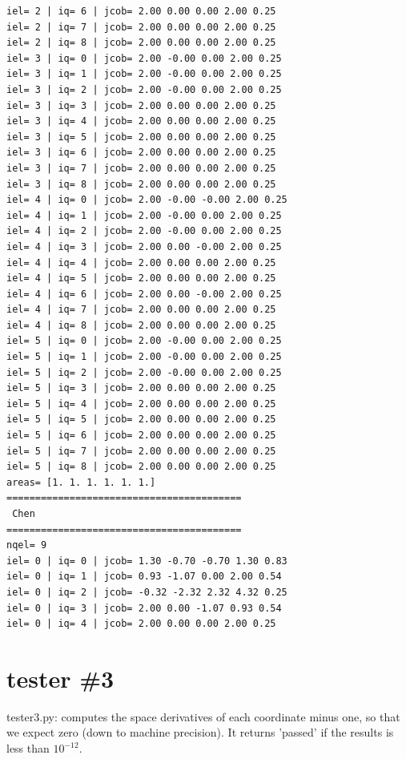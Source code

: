 \begin{tiny}
\begin{verbatim}
iel= 2 | iq= 6 | jcob= 2.00 0.00 0.00 2.00 0.25
iel= 2 | iq= 7 | jcob= 2.00 0.00 0.00 2.00 0.25
iel= 2 | iq= 8 | jcob= 2.00 0.00 0.00 2.00 0.25
iel= 3 | iq= 0 | jcob= 2.00 -0.00 0.00 2.00 0.25
iel= 3 | iq= 1 | jcob= 2.00 -0.00 0.00 2.00 0.25
iel= 3 | iq= 2 | jcob= 2.00 -0.00 0.00 2.00 0.25
iel= 3 | iq= 3 | jcob= 2.00 0.00 0.00 2.00 0.25
iel= 3 | iq= 4 | jcob= 2.00 0.00 0.00 2.00 0.25
iel= 3 | iq= 5 | jcob= 2.00 0.00 0.00 2.00 0.25
iel= 3 | iq= 6 | jcob= 2.00 0.00 0.00 2.00 0.25
iel= 3 | iq= 7 | jcob= 2.00 0.00 0.00 2.00 0.25
iel= 3 | iq= 8 | jcob= 2.00 0.00 0.00 2.00 0.25
iel= 4 | iq= 0 | jcob= 2.00 -0.00 -0.00 2.00 0.25
iel= 4 | iq= 1 | jcob= 2.00 -0.00 0.00 2.00 0.25
iel= 4 | iq= 2 | jcob= 2.00 -0.00 0.00 2.00 0.25
iel= 4 | iq= 3 | jcob= 2.00 0.00 -0.00 2.00 0.25
iel= 4 | iq= 4 | jcob= 2.00 0.00 0.00 2.00 0.25
iel= 4 | iq= 5 | jcob= 2.00 0.00 0.00 2.00 0.25
iel= 4 | iq= 6 | jcob= 2.00 0.00 -0.00 2.00 0.25
iel= 4 | iq= 7 | jcob= 2.00 0.00 0.00 2.00 0.25
iel= 4 | iq= 8 | jcob= 2.00 0.00 0.00 2.00 0.25
iel= 5 | iq= 0 | jcob= 2.00 -0.00 0.00 2.00 0.25
iel= 5 | iq= 1 | jcob= 2.00 -0.00 0.00 2.00 0.25
iel= 5 | iq= 2 | jcob= 2.00 -0.00 0.00 2.00 0.25
iel= 5 | iq= 3 | jcob= 2.00 0.00 0.00 2.00 0.25
iel= 5 | iq= 4 | jcob= 2.00 0.00 0.00 2.00 0.25
iel= 5 | iq= 5 | jcob= 2.00 0.00 0.00 2.00 0.25
iel= 5 | iq= 6 | jcob= 2.00 0.00 0.00 2.00 0.25
iel= 5 | iq= 7 | jcob= 2.00 0.00 0.00 2.00 0.25
iel= 5 | iq= 8 | jcob= 2.00 0.00 0.00 2.00 0.25
areas= [1. 1. 1. 1. 1. 1.]
=========================================
 Chen
=========================================
nqel= 9
iel= 0 | iq= 0 | jcob= 1.30 -0.70 -0.70 1.30 0.83
iel= 0 | iq= 1 | jcob= 0.93 -1.07 0.00 2.00 0.54
iel= 0 | iq= 2 | jcob= -0.32 -2.32 2.32 4.32 0.25
iel= 0 | iq= 3 | jcob= 2.00 0.00 -1.07 0.93 0.54
iel= 0 | iq= 4 | jcob= 2.00 0.00 0.00 2.00 0.25
\end{verbatim}
\end{tiny}

\newpage
\section*{tester \#3}


{\pythonfile tester3.py}: computes the space derivatives of each coordinate minus one, 
so that we expect zero (down to machine precision). It returns 'passed' if the results is 
less than $10^{-12}$.   



